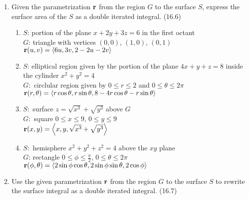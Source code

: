 \begin{enumerate}
    \newpage

    \item Given the parametrization $\mathbf{r}$ from the region $G$ to the surface $S$, express the surface area of the $S$ as a double iterated integral. (16.6)

      \begin{enumerate}
        \item 
          $S$: portion of the plane $x+2y+3z=6$ in the first octant\\
          $G$: triangle with vertices $(0,0)$, $(1,0)$, $(0,1)$\\ 
          $\mathbf{r}(u,v)=\left<6u,3v,2-2u-2v\right>$
        \item
          $S$: elliptical region given by the portion of the plane $4x+y+z=8$ inside the cylinder $x^2+y^2=4$\\
          $G:$ circlular region given by $0\leq r\leq 2$ and $0\leq\theta\leq 2\pi$\\
          $\mathbf{r}(r,\theta)=\left<r\cos\theta,r\sin\theta,8-4r\cos\theta-r\sin\theta\right>$
        \item
          $S:$ surface $z=\sqrt{x^3}+\sqrt{y^3}$ above $G$\\
          $G:$ square $0\leq x\leq 9$, $0\leq y\leq 9$\\
          $\mathbf{r}(x,y)=\left<x,y,\sqrt{x^3}+\sqrt{y^3}\right>$
        \item
          $S:$ hemisphere $x^2+y^2+z^2=4$ above the $xy$ plane\\
          $G$: rectangle $0\leq\phi\leq\frac{\pi}{2}$, $0\leq\theta\leq2\pi$\\
          $\mathbf{r}(\phi,\theta)=\left<2\sin\phi\cos\theta,2\sin\phi\sin\theta,2\cos\phi\right>$
      \end{enumerate}

    \item Use the given parametrization $\mathbf{r}$ from the region $G$ to the surface $S$ to rewrite the surface integral as a double iterated integral. (16.7)


\end{enumerate}
